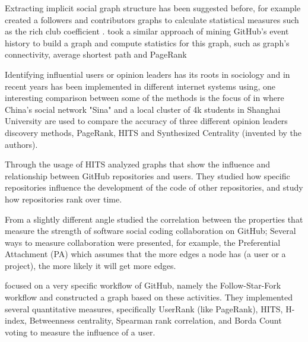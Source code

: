 \documentclass[sigconf,11pt]{acmart}
\begin{document}
Extracting implicit social graph structure has been suggested before,
for example \citeauthor{coding-together} \cite{coding-together} created a followers and contributors graphs
to calculate statistical measures such as the rich club coefficient \cite{wiki:rich-club-coefficient}.
\citeauthor{network-structure-social-coding}\cite{network-structure-social-coding} took a similar approach
of mining GitHub's event history to build a graph and compute statistics for this graph, such as
graph's connectivity, average shortest path and PageRank\cite{pagerank}

Identifying influential users or opinion leaders has its roots in sociology and in recent years has been
implemented in different internet systems using, one interesting comparison
between some of the methods is the focus of \citeauthor{identifying-top-n} in \cite{identifying-top-n}
where China's social network "Sina" and a local cluster of 4k students in Shanghai University are used
to compare the accuracy of three different opinion leaders discovery methods,
PageRank, HITS\cite{hits} and Synthesized Centrality (invented by the authors).

\citeauthor{influence-analysis-of-github-repositories}\cite{influence-analysis-of-github-repositories}
Through the usage of HITS analyzed graphs that show the influence and relationship between GitHub
repositories and users.
They studied how specific repositories influence the development of the code of other repositories,
and study how repositories rank over time.

From a slightly different angle \citeauthor{collaboration-strength-metrics-github}\cite{collaboration-strength-metrics-github}
studied the correlation between the properties that measure the strength of software social coding
collaboration on GitHub; Several ways to measure collaboration were presented, for example,
the Preferential Attachment (PA) which assumes that the more edges a node has (a user or a project),
the more likely it will get more edges.

\citeauthor{user-influence-analysis-github}\cite{user-influence-analysis-github} focused on a very specific
workflow of GitHub, namely the Follow-Star-Fork workflow and constructed a graph based on these activities.
They implemented several quantitative measures, specifically UserRank (like PageRank), HITS, H-index\cite{wiki:h-index},
Betweenness centrality\cite{betweenness}, Spearman rank correlation\cite{wiki:spearman},
and Borda Count voting\cite{wiki:borda} to measure the influence of a user.
\end{document}
